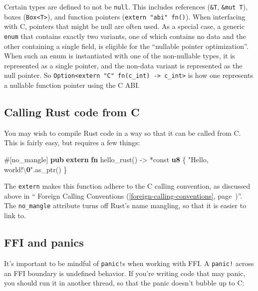 \documentclass[a4paper,]{book}
\renewcommand*{\hyperref}[2][\ar]{%
  \def\ar{#2}%
  #2 (\autoref{#1}, page~\pageref{#1})}
\newenvironment{Shaded}{\begin{snugshade}}{\end{snugshade}}
\newcommand{\KeywordTok}[1]{\textcolor[rgb]{0.13,0.29,0.53}{\textbf{{#1}}}}
\newcommand{\CharTok}[1]{\textcolor[rgb]{0.31,0.60,0.02}{{#1}}}
\newcommand{\StringTok}[1]{\textcolor[rgb]{0.31,0.60,0.02}{{#1}}}
\newcommand{\OtherTok}[1]{\textcolor[rgb]{0.56,0.35,0.01}{{#1}}}
\newcommand{\ErrorTok}[1]{\textbf{{#1}}}
\newcommand{\NormalTok}[1]{{#1}}
\begin{document}
Certain types are defined to not be \texttt{null}. This includes
references (\texttt{\&T}, \texttt{\&mut\ T}), boxes
(\texttt{Box\textless{}T\textgreater{}}), and function pointers
(\texttt{extern\ "abi"\ fn()}). When interfacing with C, pointers that
might be null are often used. As a special case, a generic \texttt{enum}
that contains exactly two variants, one of which contains no data and
the other containing a single field, is eligible for the ``nullable
pointer optimization''. When such an enum is instantiated with one of
the non-nullable types, it is represented as a single pointer, and the
non-data variant is represented as the null pointer. So
\texttt{Option\textless{}extern\ "C"\ fn(c\_int)\ -\textgreater{}\ c\_int\textgreater{}}
is how one represents a nullable function pointer using the C ABI.

\subsection{Calling Rust code from C}\label{calling-rust-code-from-c}

You may wish to compile Rust code in a way so that it can be called from
C. This is fairly easy, but requires a few things:

\begin{Shaded}
\begin{Highlighting}[]
\OtherTok{#[}\NormalTok{no_mangle}\OtherTok{]}
\KeywordTok{pub} \KeywordTok{extern} \KeywordTok{fn} \NormalTok{hello_rust() -> *const }\KeywordTok{u8} \NormalTok{\{}
    \StringTok{"Hello, world!}\CharTok{\textbackslash{}}\ErrorTok{0}\StringTok{"}\NormalTok{.as_ptr()}
\NormalTok{\}}
\end{Highlighting}
\end{Shaded}

The \texttt{extern} makes this function adhere to the C calling
convention, as discussed above in
``\hyperref[foreign-calling-conventions]{Foreign Calling Conventions}''.
The \texttt{no\_mangle} attribute turns off Rust's name mangling, so
that it is easier to link to.

\subsection{FFI and panics}\label{ffi-and-panics}

It's important to be mindful of \texttt{panic!}s when working with FFI.
A \texttt{panic!} across an FFI boundary is undefined behavior. If
you're writing code that may panic, you should run it in another thread,
so that the panic doesn't bubble up to C:
\end{document}
